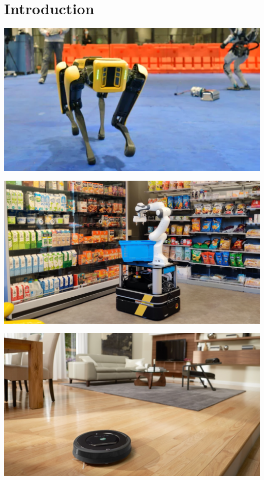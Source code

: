 \section{Introduction}
\begin{frame}[fragile]{} 
\begin{center}
\includegraphics[width=1.0\textwidth]{figures/introduction/robot1}
\end{center}
\end{frame}
\begin{frame}[fragile]{} 
\begin{center}
\includegraphics[width=1.0\textwidth]{figures/introduction/robot2}
\end{center}
\end{frame}
\begin{frame}[fragile]{} 
\begin{center}
\includegraphics[width=1.0\textwidth]{figures/introduction/robot4}
\end{center}
\end{frame}
